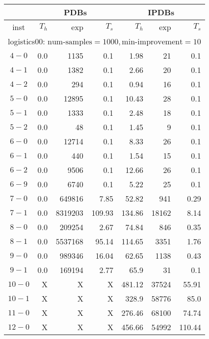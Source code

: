 \begin{longtable}{|c||r|r|r||r|r|r|}\firsthline
& \multicolumn{3}{c||}{PDBs} & \multicolumn{3}{c||}{IPDBs}\\\hline
inst & $T_h$ & exp & $T_s$ & $T_h$ & exp & $T_s$\\\hline
\multicolumn{7}{|l|}{logistics00: $\text{num-samples}=1000,\text{min-improvement}=10$}\\\hline
$4-0$ & 0.0 & 1135 & 0.1 &1.98 & 21 & 0.1 \\\hline
$4-1$ & 0.0 & 1382 & 0.1 &2.66 & 20 & 0.1 \\\hline
$4-2$ & 0.0 & 294 & 0.1 &0.94 & 16 & 0.1 \\\hline
$5-0$ & 0.0 & 12895 & 0.1 &10.43 & 28 & 0.1 \\\hline
$5-1$ & 0.0 & 1333 & 0.1 &2.48 & 18 & 0.1 \\\hline
$5-2$ & 0.0 & 48 & 0.1 &1.45 & 9 & 0.1 \\\hline
$6-0$ & 0.0 & 12714 & 0.1 &8.33 & 26 & 0.1 \\\hline
$6-1$ & 0.0 & 440 & 0.1 &1.54 & 15 & 0.1 \\\hline
$6-2$ & 0.0 & 9506 & 0.1 &12.66 & 26 & 0.1 \\\hline
$6-9$ & 0.0 & 6740 & 0.1 &5.22 & 25 & 0.1 \\\hline
$7-0$ & 0.0 & 649816 & 7.85 &52.82 & 941 & 0.29 \\\hline
$7-1$ & 0.0 & 8319203 & 109.93 &134.86 & 18162 & 8.14 \\\hline
$8-0$ & 0.0 & 209254 & 2.67 &74.84 & 846 & 0.35 \\\hline
$8-1$ & 0.0 & 5537168 & 95.14 &114.65 & 3351 & 1.76 \\\hline
$9-0$ & 0.0 & 989346 & 16.04 &62.65 & 1138 & 0.43 \\\hline
$9-1$ & 0.0 & 169194 & 2.77 &65.9 & 31 & 0.1 \\\hline
$10-0$ & X & X & X &481.12 & 37524 & 55.91 \\\hline
$10-1$ & X & X & X &328.9 & 58776 & 85.0 \\\hline
$11-0$ & X & X & X &276.46 & 68100 & 74.74 \\\hline
$12-0$ & X & X & X &456.66 & 54992 & 110.44 \\\hline


\end{longtable}
